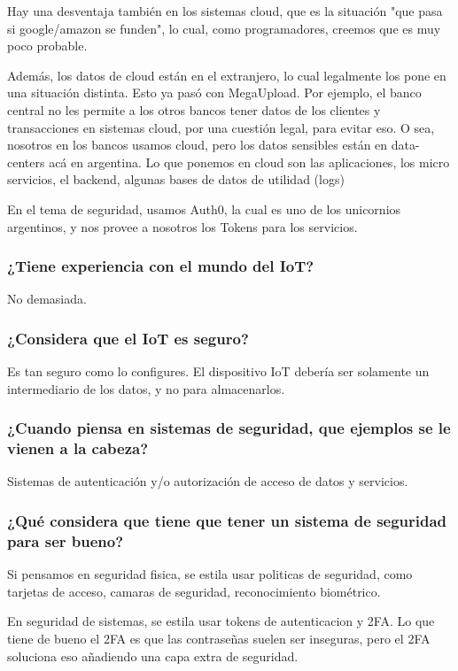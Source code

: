 \documentclass{article}
\begin{document}
Hay una desventaja también en los sistemas cloud, que es la situación "que pasa si google/amazon se funden", lo cual, como programadores, creemos que es muy poco probable.

Además, los datos de cloud están en el extranjero, lo cual legalmente los pone en una situación distinta. Esto ya pasó con MegaUpload. Por ejemplo, el banco central no les permite a los otros bancos tener datos de los clientes y transacciones en sistemas cloud, por una cuestión legal, para evitar eso.
O sea, nosotros en los bancos usamos cloud, pero los datos sensibles están en data-centers acá en argentina. Lo que ponemos en cloud son las aplicaciones, los micro servicios, el backend, algunas bases de datos de utilidad (logs)

En el tema de seguridad, usamos Auth0, la cual es uno de los unicornios argentinos, y nos provee a nosotros los Tokens para los servicios.

\subsubsection{¿Tiene experiencia con el mundo del IoT?}
No demasiada.

\subsubsection{¿Considera que el IoT es seguro?}
Es tan seguro como lo configures. El dispositivo IoT debería ser solamente un intermediario de los datos, y no para almacenarlos.

\subsubsection{¿Cuando piensa en sistemas de seguridad, que ejemplos se le vienen a la cabeza?}
Sistemas de autenticación y/o autorización de acceso de datos y servicios.

\subsubsection{¿Qué considera que tiene que tener un sistema de seguridad para ser bueno?}
Si pensamos en seguridad fisica, se estila usar politicas de seguridad, como tarjetas de acceso, camaras de seguridad, reconocimiento biométrico.

En seguridad de sistemas, se estila usar tokens de autenticacion y 2FA. Lo que tiene de bueno el 2FA es que las contraseñas suelen ser inseguras, pero el 2FA soluciona eso añadiendo una capa extra de seguridad.
\end{document}
